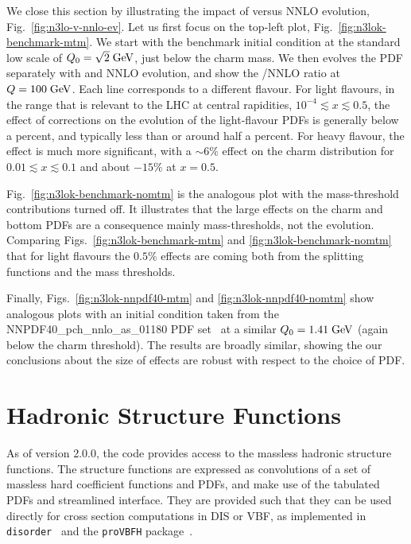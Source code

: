 We close this section by illustrating the impact of \ntlo versus NNLO
evolution, Fig.~\ref{fig:n3lo-v-nnlo-ev}.
%
Let us first focus on the top-left plot,
Fig.~\ref{fig:n3lok-benchmark-mtm}.
%
We start with the benchmark initial condition at the standard low
scale of $Q_0 = \sqrt{2}\;\mathrm{GeV}$, just below the charm mass.
%
We then evolves the PDF separately with \ntlo and NNLO evolution, and
show the \ntlo/NNLO ratio at $Q = 100\;\mathrm{GeV}$.
%
Each line corresponds to a different flavour.
%
For light flavours, in the range that is relevant to the LHC at
central rapidities, $10^{-4} \lesssim x \lesssim 0.5$, the effect of
\ntlo corrections on the evolution of the light-flavour PDFs is
generally below a percent, and typically less than or around half a
percent.
%
For heavy flavour, the effect is much more significant, with a
$\sim 6\%$ effect on the charm distribution for $0.01 \lesssim x
\lesssim 0.1$ and about $-15\%$ at $x=0.5$.

Fig.~\ref{fig:n3lok-benchmark-nomtm} is the analogous plot with the
\ntlo mass-threshold contributions turned off.
%
It illustrates that the large effects on the charm and bottom PDFs are
a consequence mainly \ntlo mass-thresholds, not the \ntlo evolution.
%
Comparing Figs.~\ref{fig:n3lok-benchmark-mtm} and
\ref{fig:n3lok-benchmark-nomtm} that for light flavours the $0.5\%$
effects are coming both from the \ntlo splitting functions and the
\ntlo mass thresholds.

Finally, Figs.~\ref{fig:n3lok-nnpdf40-mtm} and
\ref{fig:n3lok-nnpdf40-nomtm} show analogous plots with an initial
condition taken from the NNPDF40\_pch\_nnlo\_as\_01180 PDF
set~\cite{NNPDF:2021njg} at a similar $Q_0 = 1.41 \;\mathrm{GeV}$ (again below
the charm threshold).
%
The results are broadly similar, showing the our conclusions about the
size of \ntlo effects are robust with respect to the choice of PDF.



\section{Hadronic Structure Functions}
\label{sec:structure-funcs}
As of \hoppet version 2.0.0, the code provides access to the massless
hadronic structure functions. The structure functions are expressed as
convolutions of a set of massless hard coefficient functions and PDFs,
and make use of the tabulated PDFs and streamlined interface.  They
are provided such that they can be used directly for cross section
computations in DIS or VBF, as implemented in {\tt
  disorder}~\cite{Karlberg:2024hnl} and the {\tt proVBFH}
package~\cite{Cacciari:2015jma,Dreyer:2016oyx,Dreyer:2018qbw,Dreyer:2018rfu}.

